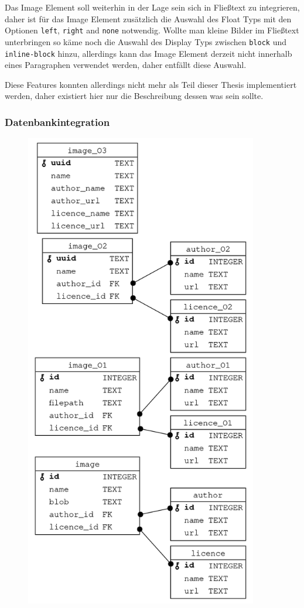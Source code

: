 Das Image Element soll weiterhin in der Lage sein sich in Fließtext zu
integrieren, daher ist für das Image Element zusätzlich die Auswahl des Float
Typs mit den Optionen \texttt{left}, \texttt{right} and \texttt{none} notwendig.
Wollte man kleine Bilder im Fließtext unterbringen so käme noch die Auswahl des
Display Typs zwischen \texttt{block} und \texttt{inline-block} hinzu, allerdings
kann das Image Element derzeit nicht innerhalb eines Paragraphen verwendet
werden, daher entfällt diese Auswahl.

Diese Features konnten allerdings nicht mehr als Teil dieser Thesis
implementiert werden, daher existiert hier nur die Beschreibung dessen was sein
sollte.

\cleardoublepage
\subsubsection{Datenbankintegration}
\label{subse:4-database-integration}

\begin{figure}
  \centering
  \includegraphics[height=21cm]{images/image_database_schemas.png}
\end{figure}

